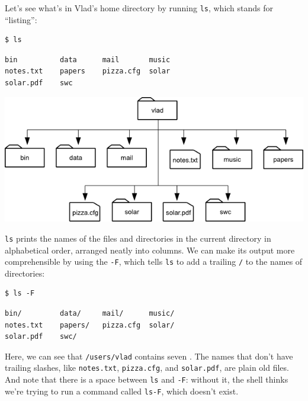 \documentclass{book}
\begin{document}
Let's see what's in Vlad's home directory by running \texttt{ls}, which
stands for ``listing'':

\begin{verbatim}
$ ls
\end{verbatim}

\begin{verbatim}
bin          data      mail       music
notes.txt    papers    pizza.cfg  solar
solar.pdf    swc
\end{verbatim}

\includegraphics{novice/shell/img/vlad-homedir.png}

\texttt{ls} prints the names of the files and directories in the current
directory in alphabetical order, arranged neatly into columns. We can
make its output more comprehensible by using the
 \texttt{-F}, which tells
\texttt{ls} to add a trailing \texttt{/} to the names of directories:

\begin{verbatim}
$ ls -F
\end{verbatim}

\begin{verbatim}
bin/         data/     mail/      music/
notes.txt    papers/   pizza.cfg  solar/
solar.pdf    swc/
\end{verbatim}

Here, we can see that \texttt{/users/vlad} contains seven
. The names that don't have
trailing slashes, like \texttt{notes.txt}, \texttt{pizza.cfg}, and
\texttt{solar.pdf}, are plain old files. And note that there is a space
between \texttt{ls} and \texttt{-F}: without it, the shell thinks we're
trying to run a command called \texttt{ls-F}, which doesn't exist.
\end{document}

